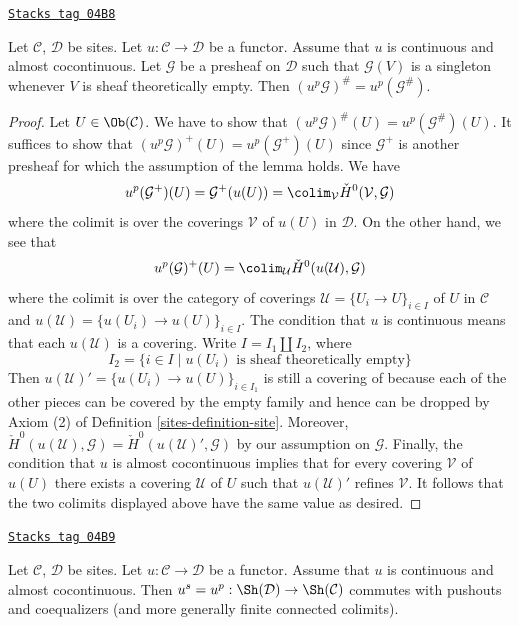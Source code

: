 \begin{lemma}
\label{sites-lemma-almost-cocontinuous-sheafification}
\href{https://stacks.math.columbia.edu/tag/04B8}{\texttt{Stacks tag 04B8}}

Let $\mathcal{C}$, $\mathcal{D}$ be sites.
Let $u : \mathcal{C} \to \mathcal{D}$ be a functor.
Assume that $u$ is continuous and almost cocontinuous.
Let $\mathcal{G}$ be a presheaf on $\mathcal{D}$ such that $\mathcal{G}(V)$ is
a singleton whenever $V$ is sheaf theoretically empty.
Then $(u^p\mathcal{G})^\# = u^p(\mathcal{G}^\#)$.
\end{lemma}

\begin{proof}

Let $U \in \Ob(\mathcal{C})$. We have to show that
$(u^p\mathcal{G})^\#(U) = u^p(\mathcal{G}^\#)(U)$.
It suffices to show that
$(u^p\mathcal{G})^+(U) = u^p(\mathcal{G}^+)(U)$
since $\mathcal{G}^+$ is another presheaf for which the
assumption of the lemma holds. We have
$$
u^p(\mathcal{G}^+)(U) =
\mathcal{G}^+(u(U)) =
\colim_\mathcal{V} \check H^0(\mathcal{V}, \mathcal{G})
$$
where the colimit is over the coverings $\mathcal{V}$ of $u(U)$ in
$\mathcal{D}$. On the other hand, we see that
$$
u^p(\mathcal{G})^+(U) =
\colim_\mathcal{U} \check H^0(u(\mathcal{U}), \mathcal{G})
$$
where the colimit is over the category of coverings
$\mathcal{U} = \{U_i \to U\}_{i \in I}$ of $U$ in $\mathcal{C}$ and
$u(\mathcal{U}) = \{u(U_i) \to u(U)\}_{i \in I}$. The condition
that $u$ is continuous means that each $u(\mathcal{U})$ is a covering.
Write $I = I_1 \amalg I_2$, where
$$
I_2 = \{i \in I \mid u(U_i)\text{ is sheaf theoretically empty}\}
$$
Then $u(\mathcal{U})' = \{u(U_i) \to u(U)\}_{i \in I_1}$ is still a covering of
because each of the other pieces can be covered by the empty family
and hence can be dropped by Axiom (2) of
Definition \ref{sites-definition-site}.
Moreover,
$\check H^0(u(\mathcal{U}), \mathcal{G}) =
\check H^0(u(\mathcal{U})', \mathcal{G})$
by our assumption on $\mathcal{G}$. Finally, the condition that $u$ is
almost cocontinuous implies that for every covering $\mathcal{V}$
of $u(U)$ there exists a covering $\mathcal{U}$ of $U$ such that
$u(\mathcal{U})'$ refines $\mathcal{V}$. It follows that the two colimits
displayed above have the same value as desired.
\end{proof}

\begin{lemma}
\label{sites-lemma-continuous-almost-cocontinuous}
\href{https://stacks.math.columbia.edu/tag/04B9}{\texttt{Stacks tag 04B9}}

Let $\mathcal{C}$, $\mathcal{D}$ be sites.
Let $u : \mathcal{C} \to \mathcal{D}$ be a functor.
Assume that $u$ is continuous and almost cocontinuous.
Then $u^s = u^p : \Sh(\mathcal{D}) \to \Sh(\mathcal{C})$
commutes with pushouts and coequalizers (and more generally
finite connected colimits).
\end{lemma}

